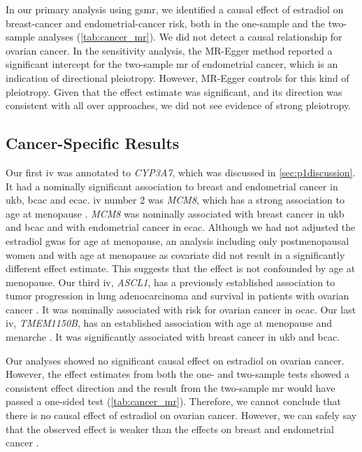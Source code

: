 \documentclass[twoside=false]{scrbook}
\begin{document}
In our primary analysis using \textsf{gsmr}, we identified a causal effect of estradiol on breast-cancer and endometrial-cancer risk, both in the one-sample and the two-sample analyses (\cref{tab:cancer_mr}).
We did not detect a causal relationship for ovarian cancer.
In the sensitivity analysis, the MR-Egger method reported a significant intercept for the two-sample \gls{mr} of endometrial cancer, which is an indication of directional pleiotropy.
However, MR-Egger controls for this kind of pleiotropy.
Given that the effect estimate was significant, and its direction was consistent with all over approaches, we did not see evidence of strong pleiotropy.

\subsection{Cancer-Specific Results}
Our first \gls{iv} was annotated to \textit{CYP3A7}, which was discussed in \cref{sec:p1discussion}.
It had a nominally significant association to breast and endometrial cancer in \gls{ukb}, \gls{bcac} and \gls{ecac}.
\Gls{iv} number 2 was \textit{MCM8}, which has a strong association to age at menopause \cite{Chen2014}.
\textit{MCM8} was nominally associated with breast cancer in \gls{ukb} and \gls{bcac} and with endometrial cancer in \gls{ecac}.
Although we had not adjusted the estradiol \gls{gwas} for age at menopause, an analysis including only postmenopausal women and with age at menopause as covariate did not result in a significantly different effect estimate.
This suggests that the effect is not confounded by age at menopause.
Our third \gls{iv}, \textit{ASCL1}, has a previously established association to tumor progression in lung adenocarcinoma  and survival in patients with ovarian cancer \cite{Miyashita2020,Moore2017}.
It was nominally associated with risk for ovarian cancer in \gls{ocac}.
Our last \gls{iv}, \textit{TMEM1150B}, has an established association with age at menopause and menarche \cite{Stolk2012,Pickrell2016}.
It was significantly associated with breast cancer in \gls{ukb} and \gls{bcac}.

Our analyses showed no significant causal effect on estradiol on ovarian cancer.
However, the effect estimates from both the one- and two-sample tests showed a consistent effect direction and the result from the two-sample \gls{mr} would have passed a one-sided test (\cref{tab:cancer_mr}).
Therefore, we cannot conclude that there is no causal effect of estradiol on ovarian cancer.
However, we can safely say that the observed effect is weaker than the effects on breast and endometrial cancer \cite{Trabert2016,Key2011,Rodriguez2019}.
\end{document}
